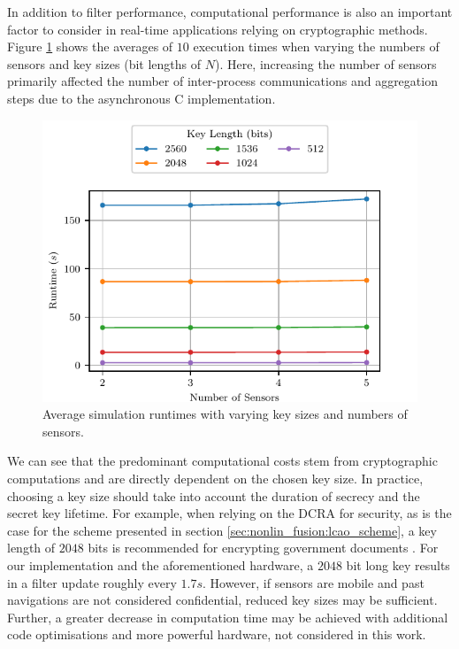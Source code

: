 In addition to filter performance, computational performance is also an important factor to consider in real-time applications relying on cryptographic methods. Figure \ref{fig:nonlin_fusion:simulation_timing} shows the averages of $10$ execution times when varying the numbers of sensors and key sizes (bit lengths of $N$). Here, increasing the number of sensors primarily affected the number of inter-process communications and aggregation steps due to the asynchronous C implementation.
\begin{figure}[htbp]
    \centering
    \includegraphics{figures/nonlin_fusion_simulation_timing.pdf}
    \caption{Average simulation runtimes with varying key sizes and numbers of sensors.}
    \label{fig:nonlin_fusion:simulation_timing}
\end{figure}
We can see that the predominant computational costs stem from cryptographic computations and are directly dependent on the chosen key size. In practice, choosing a key size should take into account the duration of secrecy and the secret key lifetime. For example, when relying on the DCRA for security, as is the case for the scheme presented in section \ref{sec:nonlin_fusion:lcao_scheme}, a key length of $2048$ bits is recommended for encrypting government documents \cite{barkerRecommendationPairWiseKey2019}. For our implementation and the aforementioned hardware, a $2048$ bit long key results in a filter update roughly every $1.7s$. However, if sensors are mobile and past navigations are not considered confidential, reduced key sizes may be sufficient. Further, a greater decrease in computation time may be achieved with additional code optimisations and more powerful hardware, not considered in this work.

